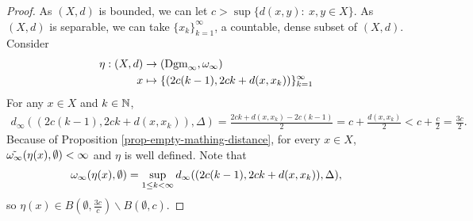 \begin{proof}
    As $ (X, d) $ is bounded, we can let $ c > \sup \{d(x, y): \  x, y \in X\} $. As $ (X, d) $ is separable, we can take $ \{x_k\}_{k=1}^\infty $, a countable, dense subset of $ (X, d) $. Consider
    \begin{align*}
        \eta: (X, d) &\to (\operatorname{Dgm}_\infty, \omega_\infty) \\
        x &\mapsto \{(2c(k-1), 2ck + d(x, x_k))\}_{k=1}^\infty
    \end{align*}
    For any $ x \in X $ and $ k \in \mathbb N$,
    \begin{align*}
        d_\infty((2c(k-1), 2ck + d(x, x_k)), \Delta) = \frac{2ck + d(x, x_k) - 2c(k-1)}{2} = c + \frac{d(x, x_k)}{2} < c + \frac{c}{2} = \frac{3c}{2}.
    \end{align*}
    Because of Proposition \ref{prop-empty-mathing-distance}, for every $ x \in X $, $ \tilde {\omega_\infty}(\eta(x), \emptyset) < \infty $ and $ \eta $ is well defined. Note that
    \begin{align*}
        \omega_\infty(\eta(x), \emptyset) = \sup_{1 \leq k < \infty} d_\infty((2c(k-1), 2ck + d(x, x_k)), \Delta),
    \end{align*}
    so $ \eta(x) \in B(\emptyset, \frac{3c}{c}) \backslash B(\emptyset, c)$.


\end{proof}
